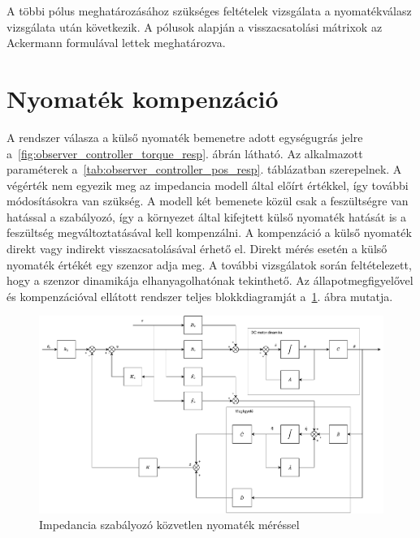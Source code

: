 A többi pólus meghatározásához szükséges feltételek vizsgálata a nyomatékválasz vizsgálata után következik.
A pólusok alapján a visszacsatolási mátrixok az Ackermann formulával lettek meghatározva.

\section{Nyomaték kompenzáció}
A rendszer válasza a külső nyomaték bemenetre adott egységugrás jelre a~\ref{fig:observer_controller_torque_resp}. ábrán látható. 
Az alkalmazott paraméterek a~\ref{tab:observer_controller_pos_resp}. táblázatban szerepelnek.
A végérték nem egyezik meg az impedancia modell által előírt értékkel, így további módosításokra van szükség.
A modell két bemenete közül csak a feszültségre van hatással a 
szabályozó, így a környezet által kifejtett külső nyomaték 
hatását is a feszültség megváltoztatásával kell kompenzálni. A kompenzáció
a külső nyomaték direkt vagy indirekt visszacsatolásával érhető el.
Direkt mérés esetén a külső nyomaték értékét egy szenzor adja meg.
A további vizsgálatok során feltételezett, hogy a szenzor dinamikája elhanyagolhatónak tekinthető. Az
állapotmegfigyelővel és kompenzációval ellátott rendszer teljes 
blokkdiagramját a~\ref{fig:block_diagram_direct_compensation}. ábra mutatja.
\begin{figure}[ht]
    \begin{center}
    \includegraphics[width=\textwidth]{images/compensated_position_control_torque.pdf}
    \caption{Impedancia szabályozó közvetlen nyomaték méréssel}\label{fig:block_diagram_direct_compensation}
    \end{center}
\end{figure}

